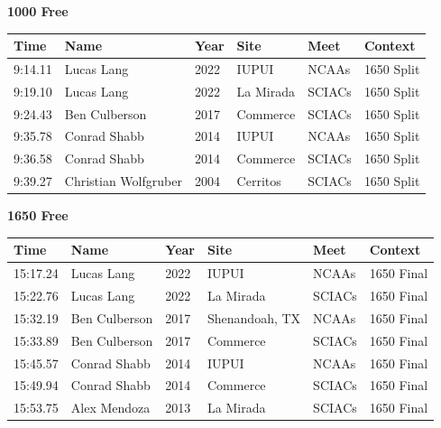 \vspace{1.2em}
\noindent\begin{minipage}[t]{0.98\textwidth}
\centering
\textbf{\textcolor{teamprimary}{1000 Free}}\par
\vspace{0.5em}
\centering
\small
\renewcommand{\arraystretch}{1.0}
\setlength{\tabcolsep}{4pt}
\begin{tabular}{@{}p{2.0cm}p{3.2cm}p{1.2cm}p{2.0cm}p{2.0cm}p{2.5cm}@{}}
\toprule
\textbf{Time} & \textbf{Name} & \textbf{Year} & \textbf{Site} & \textbf{Meet} & \textbf{Context} \\
\midrule
9:14.11 & Lucas Lang & 2022 & IUPUI & NCAAs & 1650 Split \\
9:19.10 & Lucas Lang & 2022 & La Mirada & SCIACs & 1650 Split \\
9:24.43 & Ben Culberson & 2017 & Commerce & SCIACs & 1650 Split \\
9:35.78 & Conrad Shabb & 2014 & IUPUI & NCAAs & 1650 Split \\
9:36.58 & Conrad Shabb & 2014 & Commerce & SCIACs & 1650 Split \\
9:39.27 & Christian Wolfgruber & 2004 & Cerritos & SCIACs & 1650 Split \\
\bottomrule
\end{tabular}
\end{minipage}
\vspace{1.2em}
\noindent\begin{minipage}[t]{0.98\textwidth}
\centering
\textbf{\textcolor{teamprimary}{1650 Free}}\par
\vspace{0.5em}
\centering
\small
\renewcommand{\arraystretch}{1.0}
\setlength{\tabcolsep}{4pt}
\begin{tabular}{@{}p{2.0cm}p{3.2cm}p{1.2cm}p{2.0cm}p{2.0cm}p{2.5cm}@{}}
\toprule
\textbf{Time} & \textbf{Name} & \textbf{Year} & \textbf{Site} & \textbf{Meet} & \textbf{Context} \\
\midrule
15:17.24 & Lucas Lang & 2022 & IUPUI & NCAAs & 1650 Final \\
15:22.76 & Lucas Lang & 2022 & La Mirada & SCIACs & 1650 Final \\
15:32.19 & Ben Culberson & 2017 & Shenandoah, TX & NCAAs & 1650 Final \\
15:33.89 & Ben Culberson & 2017 & Commerce & SCIACs & 1650 Final \\
15:45.57 & Conrad Shabb & 2014 & IUPUI & NCAAs & 1650 Final \\
15:49.94 & Conrad Shabb & 2014 & Commerce & SCIACs & 1650 Final \\
15:53.75 & Alex Mendoza & 2013 & La Mirada & SCIACs & 1650 Final \\
\bottomrule
\end{tabular}
\end{minipage}
